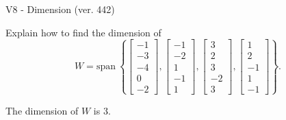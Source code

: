 \begin{exercise}
  \begin{exerciseTitle}V8 - Dimension (ver. 442)\end{exerciseTitle}
  \begin{exerciseStatement}
    Explain how to find the dimension of 
\[W=\mathrm{span}\ \left\{\left[\begin{array}{r}
-1 \\
-3 \\
-4 \\
0 \\
-2
\end{array}\right] , \left[\begin{array}{r}
-1 \\
-2 \\
1 \\
-1 \\
1
\end{array}\right] , \left[\begin{array}{r}
3 \\
2 \\
3 \\
-2 \\
3
\end{array}\right] , \left[\begin{array}{r}
1 \\
2 \\
-1 \\
1 \\
-1
\end{array}\right]\right\}.\]



  \end{exerciseStatement}
  \begin{exerciseAnswer}
   The dimension of \(W\) is  \(3\).
  


  \end{exerciseAnswer}
\end{exercise}